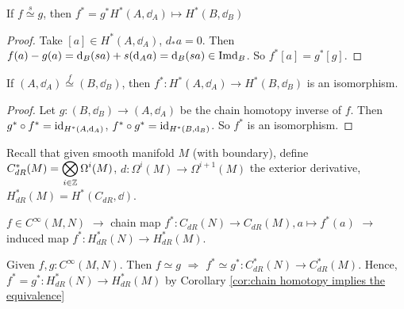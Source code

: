 
\begin{lemma}
    If  $ f\overset{s }{\simeq}  g $, then  $ f^*=g^* H^*(A,\dd_A)\mapsto H^*(B,\dd_B) $  
\end{lemma}
\begin{proof}
    Take  $ [a]\in H^*(A,\dd_A) $,  $ d_*a =0 $. Then  $ f(a)-g(a)=\mathrm{d}_B(sa)+s(\mathrm{d}_A a)=\mathrm{d}_B(sa)\in \mathrm{Im} \mathrm{d}_B $. So  $ f^*[a]=g^*[g] $.    
\end{proof}

\begin{corollary}\label{cor:chain homotopy implies the equivalence}
    If  $ (A,\dd_A)\overset{f}{\simeq}(B,\dd_B) $, then  $ f^*:H^*(A,\dd_A)\rightarrow H^*(B,\dd_B) $ is an isomorphism.  
\end{corollary}
\begin{proof}
    Let  $ g:(B,\dd_B)\rightarrow (A,\dd_A) $ be the chain homotopy inverse of  $ f $. Then  $ g^*\circ f^*=\mathrm{id}_{H^*(A,\mathrm{d}_A)} $,  $ f^*\circ g^*=\mathrm{id}_{H^*(B,\mathrm{d}_B)} $. So  $ f^* $  is an isomorphism.    
\end{proof}

Recall that given smooth manifold $ M  $ (with boundary), define  $ C_{dR}^*(M)=\displaystyle\bigotimes_{i\in \mathbb Z}\Omega^i(M) $,  $ d:\Omega^i(M)\rightarrow \Omega^{i+1}(M) $ the exterior derivative,  $ H^*_{dR}(M)=H^*(C_{dR},\dd) $.  

$ f\in C^{\infty}(M,N) $ $ \rightarrow  $ chain map   $ f^*:C_{dR}(N)\rightarrow C_{dR}(M),a\mapsto f^*(a) $      $ \rightarrow  $ induced map  $ f^*:H^*_{dR}(N)\rightarrow H^*_{dR}(M) $.

\begin{theorem}\label{thm:theorem A}
    Given  $ f, g:C^\infty(M,N ) $. Then  $ f\simeq g  $  $ \Rightarrow  $  $ f^*\simeq g^*:C_{dR}^*(N)\rightarrow C_{dR}^*(M) $. Hence,   $ f^*=g^*:H^*_{dR}(N)\rightarrow H^*_{dR}(M) $ by Corollary  \ref{cor:chain homotopy implies the equivalence}
\end{theorem}

